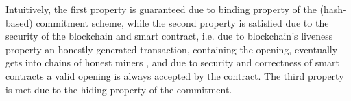 %
%
%  
 
 
 Intuitively, the first property is guaranteed due to binding property of the (hash-based) commitment scheme, while the second property is satisfied due to the security of the blockchain and smart contract, i.e. due to blockchain's liveness property an honestly generated transaction, containing the opening,  eventually gets into  chains of honest miners \cite{GarayKL15}, and due to   security and correctness of smart contracts a valid opening is always accepted by the contract. The third property is met due to the hiding property of the commitment.  
 
